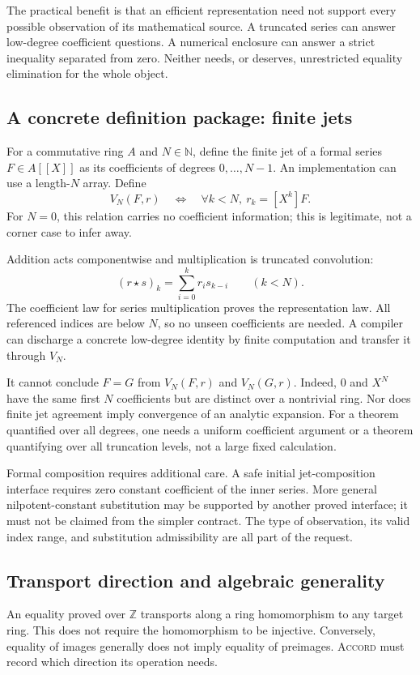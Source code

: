 \documentclass[11pt,a4paper]{article}
\newcommand{\Accord}{\textsc{Accord}}
\newcommand{\N}{\mathbb{N}}
\newcommand{\Z}{\mathbb{Z}}
\theoremstyle{definition}
\begin{document}
The practical benefit is that an efficient representation need not support every
possible observation of its mathematical source. A truncated series can answer
low-degree coefficient questions. A numerical enclosure can answer a strict
inequality separated from zero. Neither needs, or deserves, unrestricted equality
elimination for the whole object.

\subsection{A concrete definition package: finite jets}
For a commutative ring $A$ and $N\in\N$, define the finite jet of a formal series
$F\in A[[X]]$ as its coefficients of degrees $0,\ldots,N-1$. An implementation
can use a length-$N$ array. Define
\[
 V_N(F,r)\quad\Longleftrightarrow\quad
 \forall k<N,\ r_k=[X^k]F.
\]
For $N=0$, this relation carries no coefficient information; this is legitimate,
not a corner case to infer away.

Addition acts componentwise and multiplication is truncated convolution:
\[
 (r\star s)_k=\sum_{i=0}^{k}r_i s_{k-i}\qquad(k<N).
\]
The coefficient law for series multiplication proves the representation law.
All referenced indices are below $N$, so no unseen coefficients are needed.
A compiler can discharge a concrete low-degree identity by finite computation
and transfer it through $V_N$.

It cannot conclude $F=G$ from $V_N(F,r)$ and $V_N(G,r)$. Indeed, $0$ and $X^N$
have the same first $N$ coefficients but are distinct over a nontrivial ring.
Nor does finite jet agreement imply convergence of an analytic expansion.
For a theorem quantified over all degrees, one needs a uniform coefficient
argument or a theorem quantifying over all truncation levels, not a large fixed
calculation.

Formal composition requires additional care. A safe initial jet-composition
interface requires zero constant coefficient of the inner series. More general
nilpotent-constant substitution may be supported by another proved interface;
it must not be claimed from the simpler contract. The type of observation, its
valid index range, and substitution admissibility are all part of the request.

\subsection{Transport direction and algebraic generality}
An equality proved over $\Z$ transports along a ring homomorphism to any target
ring. This does not require the homomorphism to be injective. Conversely, equality
of images generally does not imply equality of preimages. \Accord{} must record
which direction its operation needs.
\end{document}
